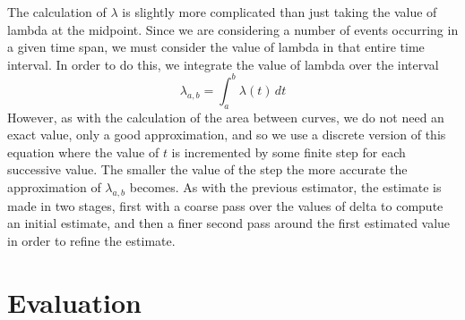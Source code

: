 \documentclass[a4paper,11pt]{article}
\begin{document}
The calculation of $\lambda$ is slightly more complicated than just taking the
value of lambda at the midpoint. Since we are considering a number of events
occurring in a given time span, we must consider the value of lambda in that
entire time interval. In order to do this, we integrate the value of lambda over
the interval
\begin{equation}
\lambda_{a,b}=\int_a^b\lambda(t)\,dt
\end{equation}
However, as with the calculation of the area between curves, we do not need an
exact value, only a good approximation, and so we use a discrete version of this
equation where the value of $t$ is incremented by some finite step for each successive
value. The smaller the value of the step the more accurate the approximation of
$\lambda_{a,b}$ becomes. As with the previous estimator, the estimate is made in
two stages, first with a coarse pass over the values of delta to compute an
initial estimate, and then a finer second pass around the first estimated value
in order to refine the estimate.
\section{Evaluation}
\label{sec-8}
\end{document}
